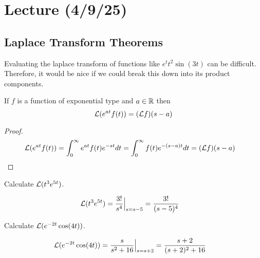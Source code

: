 \documentclass[notes]{subfiles}
\begin{document}
\setcounter{section}{19}
\section{Lecture (4/9/25)}

\subsection{Laplace Transform Theorems}
Evaluating the laplace transform of functions like $e^t t^2 \sin(3t)$ can be difficult. Therefore, it would be nice if we could break this down into its product components.

\begin{theorem} \label{first_translation_theorem}
    If $f$ is a function of exponential type and $a \in \mathbb{R}$ then
    \[
        \mathcal{L}(e^{at}f(t)) = (\mathcal{L} f)(s - a)
    \]
\end{theorem}
\begin{proof}
    \begin{align*}
        \mathcal{L}(e^{at}f(t))
        &= \int_0^\infty e^{at}f(t)e^{-st}dt
        = \int_0^\infty f(t)e^{-(s - a)t}dt
        = (\mathcal{L} f)(s - a)
    \end{align*}
\end{proof}

\begin{exercise}
    Calculate $\mathcal{L}(t^3e^{5t})$.
\end{exercise}
\begin{solution}
    \begin{align*}
        \mathcal{L}(t^3e^{5t})
        &= \frac{3!}{s^4}\Big|_{s = s - 5}
        = \frac{3!}{(s - 5)^4}
    \end{align*}
\end{solution}

\begin{exercise}
    Calculate $\mathcal{L}(e^{-2t}\cos(4t))$.
\end{exercise}
\begin{solution}
    \begin{align*}
        \mathcal{L}(e^{-2t}\cos(4t))
        &= \frac{s}{s^2 + 16}\Big|_{s = s + 2}
        = \frac{s + 2}{(s + 2)^2 + 16}
    \end{align*}
\end{solution}
\end{document}
